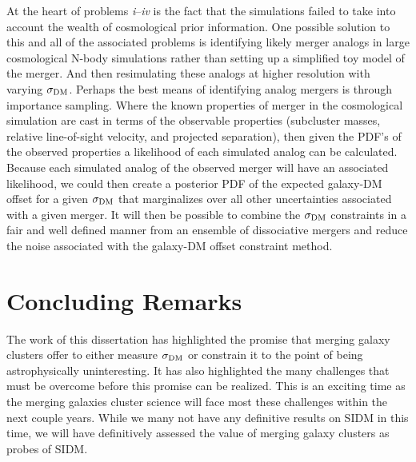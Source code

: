 At the heart of problems \textit{i}--\textit{iv} is the fact that the simulations failed to take into account the wealth of cosmological prior information.
One possible solution to this and all of the associated problems is identifying likely merger analogs in large cosmological N-body simulations rather than setting up a simplified toy model of the merger.
And then resimulating these analogs at higher resolution with varying $\sigma_{\rm DM}$.
Perhaps the best means of identifying analog mergers is through importance sampling. 
Where the known properties of merger in the cosmological simulation are cast in terms of the observable properties (subcluster masses, relative line-of-sight velocity, and projected separation), then given the PDF's of the observed properties a likelihood of each simulated analog can be calculated.
Because each simulated analog of the observed merger will have an associated likelihood, we could then create a posterior PDF of the expected galaxy-DM offset for a given $\sigma_{\rm DM}$ that marginalizes over all other uncertainties associated with a given merger.
It will then be possible to combine the $\sigma_{\rm DM}$ constraints in a fair and well defined manner from an ensemble of dissociative mergers and reduce the noise associated with the galaxy-DM offset constraint method.

\section{Concluding Remarks}

The work of this dissertation has highlighted the promise that merging galaxy clusters offer to either measure $\sigma_{\rm DM}$ or constrain it to the point of being astrophysically uninteresting.
It has also highlighted the many challenges that must be overcome before this promise can be realized.
This is an exciting time as the merging galaxies cluster science will face most these challenges within the next couple years.
While we many not have any definitive results on SIDM in this time, we will have definitively assessed the value of merging galaxy clusters as probes of SIDM.

%



%
%  

